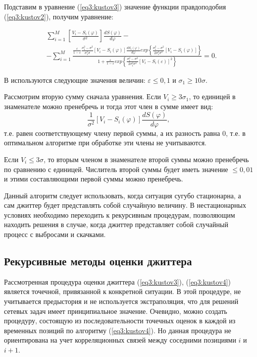 Подставим в уравнение (\ref{eq3:kustov3}) значение функции правдоподобия (\ref{eq3:kustov2}), получим уравнение:

\begin{equation}\label{eq3:kustov4}
\begin{split}
&\sum_{i=1}^M\left[\frac{V_i-S_i(\varphi)}{\sigma^2}\right]\frac{dS(\varphi)}{d\varphi}-\\
&-\sum_{i=1}^M\frac{\frac{\varepsilon}{1-\varepsilon}\frac{\sigma_1^2-\sigma^2}{\sigma_1^3\sigma}[V_i-S_i(\varphi)]\frac{dS_i(\varphi)}{d\varphi}exp\left\{\frac{\sigma_1^2-\sigma^2}{2\sigma_1^2\sigma^2}[V_i-S_i(\varphi)]\right\}}{1+\frac{\varepsilon}{1-\varepsilon}exp\left\{\frac{\sigma_1^2-\sigma^2}{2\sigma_1^2\sigma^2}[V_i-S_i(\varepsilon)]^2\right\}}=0.
\end{split}
\end{equation}

В \cite{kustova} используются следующие значения величин: $\varepsilon\leq0,1$ и $\sigma_1\geq10\sigma$.

Рассмотрим вторую сумму сначала уравнения. Если $V_i\geq3\sigma_1$, то единицей в знаменателе можно пренебречь и тогда этот член в сумме имеет вид:
\begin{equation}\label{eq3:kustov5}
\frac{1}{\sigma^2}[V_i-S_i(\varphi)]\frac{dS(\varphi)}{d\varphi},
\end{equation}
\noindent т.е. равен соответствующему члену первой суммы, а их разность равна 0, т.е. в оптимальном алгоритме при обработке эти члены не учитываются.

Если $V_i\leq3\sigma$, то вторым членом в знаменателе второй суммы можно пренебречь по сравнению с единицей. Числитель второй суммы будет иметь значение $\leq0,01$ и этими составляющими первой суммы можно пренебречь.

Данный алгоритм следует использовать, когда ситуация сугубо стационарна, а сам джиттер будет представлять собой случайную величину.
В нестационарных условиях необходимо переходить к рекурсивным процедурам, позволяющим находить решения в случае, когда джиттер представляет собой случайный процесс с выбросами и скачками.

\subsection{Рекурсивные методы оценки джиттера}

Рассмотренная процедура оценки джиттера (\ref{eq3:kustov3}), (\ref{eq3:kustov4}) является точечной, привязанной к конкретной ситуации. В этой процедуре, не учитывается предыстория и не используется экстраполяция, что для решений сетевых задач имеет принципиальное значение. 
Очевидно, можно создать процедуру, состоящую из последовательности точечных оценок в каждой из временных позиций по алгоритму (\ref{eq3:kustov4}).
Но данная процедура не ориентирована на учет корреляционных связей между соседними позициями $i$ и $i+1$.


